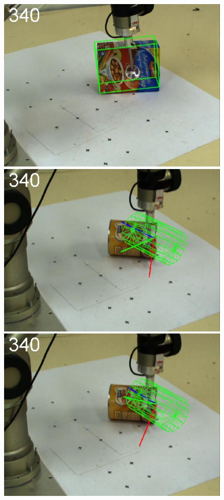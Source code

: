 \begin{figure}[htbp]
{\includegraphics[width=\imgAXwid]{./A2_2exp_87_5}
\includegraphics[width=\imgAXwid]{./A3_2exp_39_5}
\includegraphics[width=\imgAXwid]{./A3_LWPR1_39_5}
}
\end{figure}
